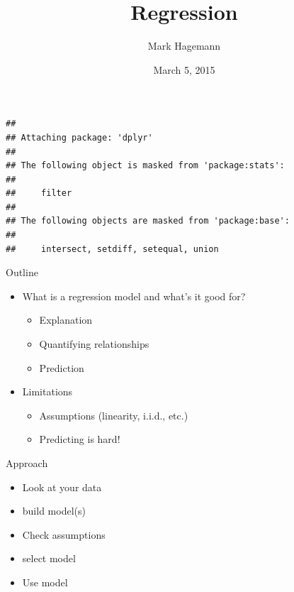 \documentclass[ignorenonframetext,]{beamer}
\title{Regression}
\author{Mark Hagemann}
\date{March 5, 2015}
\begin{document}
\frame{\titlepage}

\begin{frame}[fragile]

\begin{Verbatim}[fontsize=\small]
## 
## Attaching package: 'dplyr'
## 
## The following object is masked from 'package:stats':
## 
##     filter
## 
## The following objects are masked from 'package:base':
## 
##     intersect, setdiff, setequal, union
\end{Verbatim}

\end{frame}

\begin{frame}{Outline}

\begin{itemize}[<+->]
\itemsep1pt\parskip0pt
\item
  What is a regression model and what's it good for?

  \begin{itemize}[<+->]
  \itemsep1pt\parskip0pt
  \item
    Explanation
  \item
    Quantifying relationships
  \item
    Prediction
  \end{itemize}
\item
  Limitations

  \begin{itemize}[<+->]
  \itemsep1pt\parskip0pt
  \item
    Assumptions (linearity, i.i.d., etc.)
  \item
    Predicting is hard!
  \end{itemize}
\end{itemize}

\end{frame}

\begin{frame}{Approach}

\begin{itemize}[<+->]
\itemsep1pt\parskip0pt
\item
  Look at your data
\item
  build model(s)
\item
  Check assumptions
\item
  select model
\item
  Use model
\end{itemize}

\end{frame}
\end{document}
